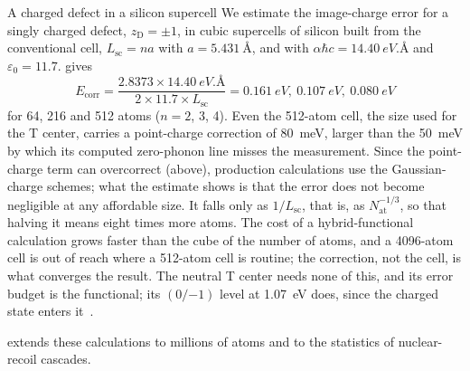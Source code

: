 \begin{workedexample}{A charged defect in a silicon supercell}\label{we:E-sidefect}
We estimate the image-charge error for a singly charged defect, $z_{\mathrm{D}} = \pm1$, in cubic supercells of silicon built from the conventional cell, $L_{\mathrm{sc}} = na$ with $a = \SI{5.431}{\angstrom}$, and with $\alpha\hbar c = \SI{14.40}{eV.\angstrom}$ and $\varepsilon_0 = 11.7$.  gives
\begin{equation*}
  E_{\mathrm{corr}} = \frac{2.8373\times\SI{14.40}{eV.\angstrom}}{2\times11.7\times L_{\mathrm{sc}}}
  = \SI{0.161}{eV},\ \SI{0.107}{eV},\ \SI{0.080}{eV}
\end{equation*}
for 64, 216 and 512 atoms ($n = 2$, 3, 4). Even the 512-atom cell, the size used for the T center, carries a point-charge correction of \SI{80}{meV}, larger than the \SI{50}{meV} by which its computed zero-phonon line misses the measurement. Since the point-charge term can overcorrect (above), production calculations use the Gaussian-charge schemes; what the estimate shows is that the error does not become negligible at any affordable size. It falls only as $1/L_{\mathrm{sc}}$, that is, as $N_{\mathrm{at}}^{-1/3}$, so that halving it means eight times more atoms. The cost of a hybrid-functional calculation grows faster than the cube of the number of atoms, and a 4096-atom cell is out of reach where a 512-atom cell is routine; the correction, not the cell, is what converges the result. The neutral T center needs none of this, and its error budget is the functional; its $(0/{-1})$ level at \SI{1.07}{eV} does, since the charged state enters it~\cite{dhaliah2022first}.
\end{workedexample}

 extends these calculations to millions of atoms and to the statistics of nuclear-recoil cascades.

